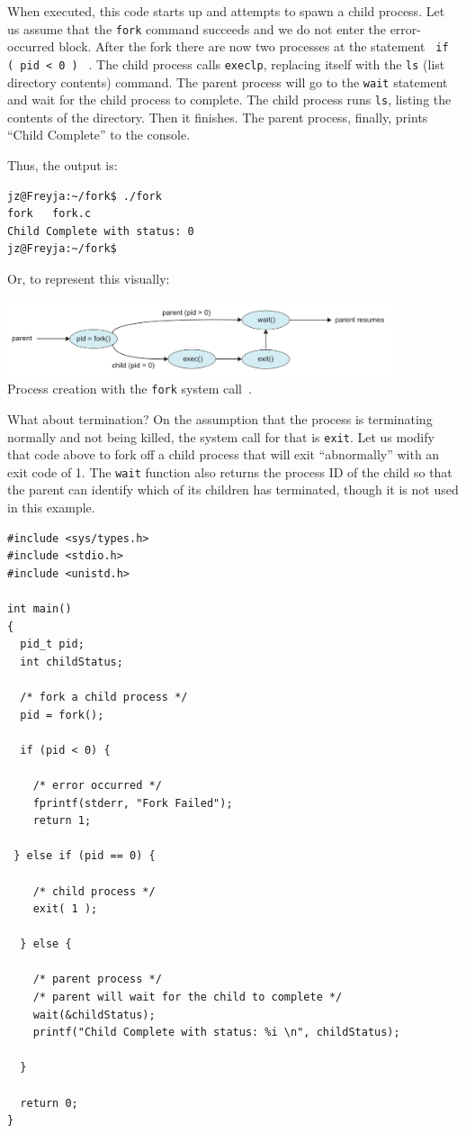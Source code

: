 When executed, this code starts up and attempts to spawn a child process. Let us assume that the \texttt{fork} command succeeds and we do not enter the error-occurred block.  After the fork there are now two processes at the statement \texttt{ if ( pid < 0 ) } . The child process calls \texttt{execlp}, replacing itself with the \texttt{ls} (list directory contents) command. The parent process will go to the \texttt{wait} statement and wait for the child process to complete. The child process runs \texttt{ls}, listing the contents of the directory. Then it finishes. The parent process, finally, prints ``Child Complete'' to the console.

Thus, the output is:
\begin{verbatim}
jz@Freyja:~/fork$ ./fork 
fork   fork.c
Child Complete with status: 0
jz@Freyja:~/fork$ 
\end{verbatim}

Or, to represent this visually:

\begin{center}
\includegraphics[width=0.85\textwidth]{images/fork-syscall.png}\\
Process creation with the \texttt{fork} system call~\cite{osc}.
\end{center}

What about termination? On the assumption that the process is terminating normally and not being killed, the system call for that is \texttt{exit}. Let us modify that code above to fork off a child process that will exit ``abnormally'' with an exit code of 1. The \texttt{wait} function also returns the process ID of the child so that the parent can identify which of its children has terminated, though it is not used in this example.


\begin{verbatim}
#include <sys/types.h>
#include <stdio.h> 
#include <unistd.h>

int main()
{
  pid_t pid;
  int childStatus;

  /* fork a child process */
  pid = fork();
  
  if (pid < 0) { 
  
    /* error occurred */ 
    fprintf(stderr, "Fork Failed"); 
    return 1;
    
 } else if (pid == 0) { 
    
    /* child process */
    exit( 1 );
    
  } else { 
    
    /* parent process */
    /* parent will wait for the child to complete */
    wait(&childStatus);
    printf("Child Complete with status: %i \n", childStatus);
    
  }
    
  return 0;
}
\end{verbatim}

